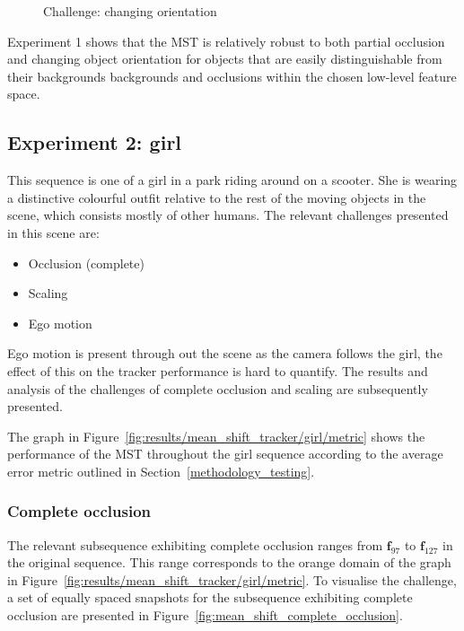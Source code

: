 \begin{figure}
{\begin{tabular}{cccc}
        \end{tabular}}
    \caption{Challenge: changing orientation\label{fig:mean_shift_orientation}
 }
\end{figure}

Experiment 1 shows that the MST is relatively robust to both partial occlusion and changing
object orientation for objects that are easily distinguishable from their
backgrounds backgrounds and occlusions within the chosen low-level feature space.

\subsection{Experiment 2: girl}
This sequence is one of a girl in a park riding around on a scooter. She is
wearing a distinctive colourful outfit relative to the rest of the moving objects in the
scene, which consists mostly of other humans.
The relevant challenges presented in this scene are:
\begin{itemize}
    \item Occlusion (complete)
    \item Scaling 
    \item Ego motion  
\end{itemize}

Ego motion is present through out the scene as the camera follows the girl, the
effect of this on the tracker performance is hard to quantify. The results and
analysis of the challenges of complete occlusion and scaling are subsequently
presented.

The graph in Figure~\ref{fig:results/mean_shift_tracker/girl/metric} shows the
performance of the MST throughout the girl sequence according to the average error metric outlined in
Section~\ref{methodology_testing}.  


\subsubsection{Complete occlusion}
The relevant subsequence exhibiting complete occlusion ranges from $\mathbf{f}_{97}$ to
$\mathbf{f}_{127}$ in the original sequence. This range corresponds to 
the orange domain of the graph in
Figure~\ref{fig:results/mean_shift_tracker/girl/metric}. To visualise the
challenge, a set of equally spaced snapshots for the subsequence exhibiting complete occlusion
are presented in Figure~\ref{fig:mean_shift_complete_occlusion}.

